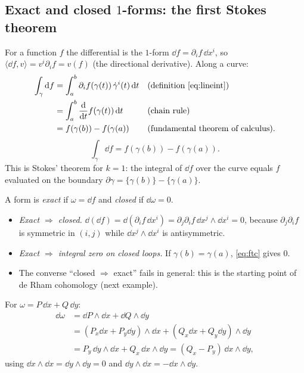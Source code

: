 \subsection{Exact and closed $1$-forms: the first Stokes theorem}\label{sec:expl-closed}

For a function $f$ the differential is the $1$-form $\dd f=\partial_if\,\dd x^i$, so $\langle\dd f,v\rangle=v^i\partial_if=v(f)$ (the directional derivative). Along a curve:
\begin{align*}
\int_\gamma\mathrm{d} f&=\int_a^b\partial_if(\gamma(t))\,\dot\gamma^i(t)\,\mathrm{d} t &&\text{(definition \eqref{eq:lineint})}\\
&=\int_a^b\frac{\mathrm{d}}{\mathrm{d} t}f(\gamma(t))\,\mathrm{d} t &&\text{(chain rule)}\\
&=f(\gamma(b))-f(\gamma(a)) &&\text{(fundamental theorem of calculus).}
\end{align*}
\begin{equation}\label{eq:ftc}
\int_\gamma\dd f=f(\gamma(b))-f(\gamma(a)).
\end{equation}
This is Stokes' theorem for $k=1$: the integral of $\dd f$ over the curve equals $f$ evaluated on the boundary $\partial\gamma=\{\gamma(b)\}-\{\gamma(a)\}$.

A form is \emph{exact} if $\omega=\dd f$ and \emph{closed} if $\dd\omega=0$.
\begin{itemize}
\item \emph{Exact $\Rightarrow$ closed.} $\dd(\dd f)=\dd(\partial_if\,\dd x^i)=\partial_j\partial_if\,\dd x^j\wedge\dd x^i=0$, because $\partial_j\partial_if$ is symmetric in $(i,j)$ while $\dd x^j\wedge\dd x^i$ is antisymmetric.
\item \emph{Exact $\Rightarrow$ integral zero on closed loops.} If $\gamma(b)=\gamma(a)$, \eqref{eq:ftc} gives $0$.
\item The converse ``closed $\Rightarrow$ exact'' fails in general: this is the starting point of de Rham cohomology (next example).
\end{itemize}

For $\omega=P\,\dd x+Q\,\dd y$:
\begin{align*}
\dd\omega&=\dd P\wedge\dd x+\dd Q\wedge\dd y\\
&=(P_x\dd x+P_y\dd y)\wedge\dd x+(Q_x\dd x+Q_y\dd y)\wedge\dd y\\
&=P_y\,\dd y\wedge\dd x+Q_x\,\dd x\wedge\dd y=(Q_x-P_y)\,\dd x\wedge\dd y,
\end{align*}
using $\dd x\wedge\dd x=\dd y\wedge\dd y=0$ and $\dd y\wedge\dd x=-\dd x\wedge\dd y$.

